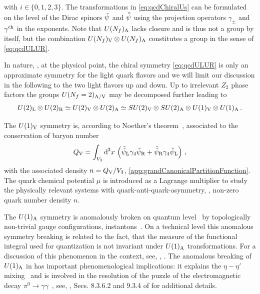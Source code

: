with $i\in\{0,1,2,3\}$.
The transformations in \cref{eq:qcdChiralUs} can be formulated on the level of the Dirac spinors $\tilde{\psi}$ and $\tilde{\bar{\psi}}$ using the projection operators $\gamma_\pm$ and $\gamma^{\mathrm{ch}}$ in the exponents.
Note that $U(N_f)_{\mathrm{A}}$ lacks closure and is thus not a group by itself, but the combination $U(N_f)_{\mathrm{V}}\otimes U(N_f)_{\mathrm{A}}$ constitutes a group in the sense of \cref{eq:qcdULUR}.

In nature, \ie{}, at the physical point, the chiral symmetry \eqref{eq:qcdULUR} is only an approximate symmetry for the light quark flavors and we will limit our discussion in the following to the two light flavors up and down. 
Up to irrelevant $Z_2$ phase factors the groups $U(N_f=2)_{\mathrm{A}/\mathrm{V}}$ may be decomposed further leading to
\begin{align}
	U(2)_{\mathrm{L}}\otimes U(2)_{\mathrm{R}}\simeq U(2)_{\mathrm{V}}\otimes U(2)_{\mathrm{A}} \simeq SU(2)_{\mathrm{V}}\otimes SU(2)_{\mathrm{A}}\otimes U(1)_{\mathrm{V}}\otimes U(1)_{\mathrm{A}}\, .
	\label{eq:qcdChiral}
\end{align}

The $U(1)_{\mathrm{V}}$ symmetry is, according to Noether’s theorem~\cite{Noether:1918zz,Noether:1918b}, associated to the conservation of baryon number
\begin{align}
	Q_\suV=\int_{V_3}\dif^{\,3}\! x\,\del{\Fpsib_{\suL}\gamma_4 \Fpsi_{\suR}+\Fpsib_{\suR}\gamma_4 \Fpsi_{\suL}}\, ,\label{eq:qcdQV}
\end{align}
with the associated density $n=Q_{\mathrm{V}}/V_3$, \cf{} \cref{app:grandCanonicalPartitionFunction}.
The quark chemical potential $\mu$ is introduced as a Lagrange multiplier to study the physically relevant systems with quark-anti-quark-asymmetry, \ie{}, non-zero quark number density $n$.

The $U(1)_{\mathrm{A}}$ symmetry is anomalously broken on quantum level~\cite{Adler:1969gk,Adler:1969er,Bell:1969ts,Bardeen:1969md} by topologically non-trivial gauge configurations, \viz{} instantons~\cite{tHooft:1976rip,tHooft:1976snw}.
On a technical level this anomalous symmetry breaking is related to the fact, that the measure of the functional integral used for quantization is not invariant under $U(1)_{\mathrm{A}}$ transformations. 
For a discussion of this phenomenon in the \frg{} context, see, \eg{}, .
The anomalous breaking of $U(1)_{\mathrm{A}}$ in \qcd{} has important phenomenological implications: it explains the $\eta-\eta'$ mixing~\cite{Kobayashi:1970ji,Kobayashi:1971qz,DelDebbio:2004ns,Luscher:2010ik,Ce:2014sfa} and is involved in the resolution of the \pcac{} puzzle of the electromagnetic decay $\pi^0\rightarrow \gamma\gamma$~\cite{Bell:1969ts}, see, \eg{}, Secs. 8.3.6.2 and 9.3.4 of  for additional details.

